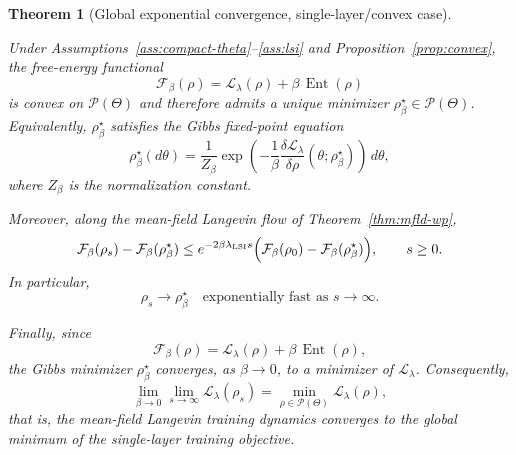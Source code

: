 \documentclass[11pt,a4wide]{article}
\newtheorem{theorem}{Theorem}[section]
\theoremstyle{definition}
\newcommand{\Prob}{\mathcal{P}}
\DeclareMathOperator{\Ent}{Ent}
\begin{document}
\begin{theorem}[Global exponential convergence, single-layer/convex case]
\label{thm:convex-conv}

Under Assumptions~\ref{ass:compact-theta}--\ref{ass:lsi} and
Proposition~\ref{prop:convex}, the free-energy functional
\[
\mathcal F_\beta(\rho)
=
\mathcal L_\lambda(\rho)
+
\beta\,\Ent(\rho)
\]
is convex on $\Prob(\Theta)$ and therefore admits a unique minimizer
$\rho_\beta^\star\in\Prob(\Theta)$. Equivalently,
$\rho_\beta^\star$ satisfies the Gibbs fixed-point equation
\[
\rho_\beta^\star(d\theta)
=
\frac1{Z_\beta}
\exp\!\left(
-\frac1\beta
\frac{\delta\mathcal L_\lambda}{\delta\rho}
(\theta;\rho_\beta^\star)
\right)
\,d\theta,
\]
where $Z_\beta$ is the normalization constant.

Moreover, along the mean-field Langevin flow of
Theorem~\ref{thm:mfld-wp},
\begin{equation}\label{decay}
\mathcal F_\beta(\rho_s)-\mathcal F_\beta(\rho_\beta^\star)
\le
e^{-2\beta\lambda_{\mathrm{LSI}}s}
\Bigl(
\mathcal F_\beta(\rho_0)
-
\mathcal F_\beta(\rho_\beta^\star)
\Bigr),
\qquad s\ge0.
\end{equation} 
In particular,
\[
\rho_s
\longrightarrow
\rho_\beta^\star
\quad\text{exponentially fast as }s\to\infty.
\]

Finally, since
\[
\mathcal F_\beta(\rho)
=
\mathcal L_\lambda(\rho)
+
\beta\,\Ent(\rho),
\]
the Gibbs minimizer $\rho_\beta^\star$ converges, as $\beta\to0$, to a
minimizer of $\mathcal L_\lambda$. Consequently,
\[
\lim_{\beta\to0}
\lim_{s\to\infty}
\mathcal L_\lambda(\rho_s)
=
\min_{\rho\in\Prob(\Theta)}
\mathcal L_\lambda(\rho),
\]
that is, the mean-field Langevin training dynamics converges to the global
minimum of the single-layer training objective.
\end{theorem}
\end{document}
